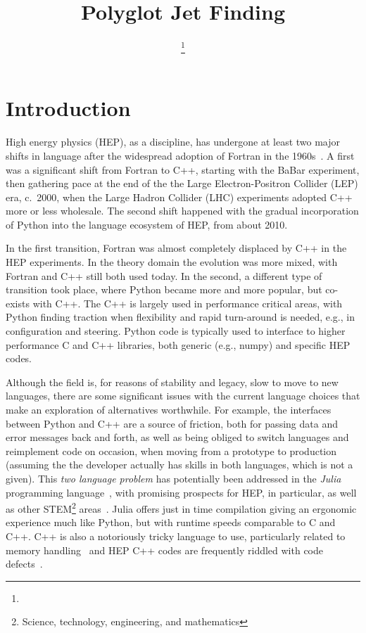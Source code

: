 \documentclass{webofc}
\title{Polyglot Jet Finding}
\author{\firstname{Graeme Andrew} \lastname{Stewart}\inst{1}\fnsep\thanks{\email{graeme.andrew.stewart@cern.ch}} \and
        \firstname{Philippe} \lastname{Gras}\inst{2}\fnsep \and
        \firstname{Benedikt} \lastname{Hegner}\inst{1}\fnsep \and
        \firstname{Atell} \lastname{Krasnopolski}\inst{3}
}
\institute{CERN, Esplanade des Particules 1, Geneva, Switzerland
\and
           IRFU, CEA, Université Paris-Saclay, Gif-sur-Yvette, France
\and
           Taras Shevchenko National University of Kyiv, Ukraine
          }
\begin{document}
\maketitle

\section{Introduction}
\label{sec:introduction}

High energy physics (HEP), as a discipline, has undergone at least two major
shifts in language after the widespread adoption of Fortran in the
1960s~\cite{pivarski2022}. A first was a significant shift from Fortran to C++,
starting with the BaBar experiment, then gathering pace at the end of the the
Large Electron-Positron Collider (LEP) era, c.\ 2000, when the Large Hadron
Collider (LHC) experiments adopted C++ more or less wholesale. The second shift
happened with the gradual incorporation of Python into the language ecosystem of
HEP, from about 2010.

In the first transition, Fortran was almost completely displaced by C++ in the
HEP experiments. In the theory domain the evolution was more mixed, with Fortran
and C++ still both used today. In the second, a different type of transition
took place, where Python became more and more popular, but co-exists with C++.
The C++ is largely used in performance critical areas, with Python finding
traction when flexibility and rapid turn-around is needed, e.g., in
configuration and steering. Python code is typically used to interface to higher
performance C and C++ libraries, both generic (e.g., numpy) and specific HEP
codes.

Although the field is, for reasons of stability and legacy, slow to move to new
languages, there are some significant issues with the current language choices
that make an exploration of alternatives worthwhile. For example, the interfaces
between Python and C++ are a source of friction, both for passing data and error
messages back and forth, as well as being obliged to switch languages and
reimplement code on occasion, when moving from a prototype to production
(assuming the the developer actually has skills in both languages, which is not
a given). This \emph{two language problem} has potentially been addressed in the
\emph{Julia} programming
language~\cite{bib:julia_freshapproach,10.1145/3276490}, with promising
prospects for HEP, in particular, \cite{Stanitzki:2020bnx,eschle2023potential}
as well as other STEM\footnote{Science, technology, engineering, and
mathematics} areas~\cite{perkel-julia-science}. Julia offers just in time
compilation giving an ergonomic experience much like Python, but with runtime
speeds comparable to C and C++. C++ is also a notoriously tricky language to
use, particularly related to memory handling~\cite{ms-security-2019} and HEP C++
codes are frequently riddled with code defects~\cite{Naumann_2014}.
\end{document}
